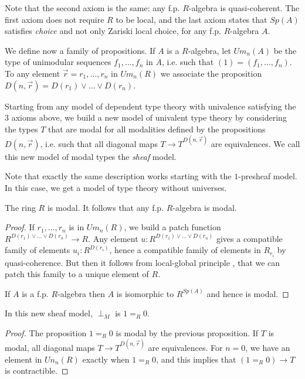 Note that the second axiom is the same: any f.p. $R$-algebra is quasi-coherent. The first axiom does not require
$R$ to be local, and the last axiom states that $Sp(A)$ satisfies \emph{choice} and not only Zariski local choice,
for any f.p. $R$-algebra $A$.

We define now a family of propositions. If $A$ is a $R$-algebra, let $Um_n(A)$ be the type of unimodular sequences
\cite{lombardi-quitte}
$f_1,\dots,f_n$ in $A$, i.e. such that $(1) = (f_1,\dots,f_n)$. To any element $\vec{r} = r_1,\dots,r_n$
in $Um_n(R)$ we associate
the proposition $D(n,\vec{r}) = D(r_1)\vee\dots\vee D(r_n)$.%

  Starting from any model of dependent type theory with univalence satisfying the 3 axioms above, we build a new
  model of univalent type theory by considering the types $T$ that are modal for all modalities defined by the propositions
  $D(n,\vec{r})$, i.e. such that all diagonal maps $T\rightarrow T^{D(n,\vec{r})}$ are equivalences.
    We call this new model of modal types the \emph{sheaf} model.

    Note that exactly the same description works starting with the $1$-presheaf model. In this case, we get a model
    of type theory without universes.

    \begin{proposition}\label{modal}
      The ring $R$ is modal. It follows that any f.p. $R$-algebra is modal.
    \end{proposition}

    \begin{proof}
      If $r_1,\dots,r_n$ is in $Um_n(R)$, we build a patch function $R^{D(r_1)\vee\dots\vee D(r_n)}\rightarrow R$.
      Any element $u:R^{D(r_1)\vee\dots\vee D(r_n)}$ gives a compatible family of elements $u_i:R^{D(r_i)}$, hence
      a compatible family of elements in $R_{r_i}$ by quasi-coherence. But then it follows from local-global
      principle \cite{lombardi-quitte}, that we can patch this family to a unique element of $R$.
      
      If $A$ is a f.p. $R$-algebra then $A$ is isomorphic to $R^{Sp(A)}$ and hence is modal.
    \end{proof}

    \begin{proposition}
      In this new sheaf model, $\perp_M$ is $1 =_R 0$.
    \end{proposition}

    \begin{proof}
      The proposition $1=_R0$ is modal by the previous proposition.
      If $T$ is modal, all diagonal maps $T\rightarrow T^{D(n,\vec{r})}$ are equivalences. For $n = 0$, we have
      an element in $Un_n(R)$ exactly when $1=_R0$, and this implies that $(1=_R0)\rightarrow T$ is contractible.
    \end{proof}
    
